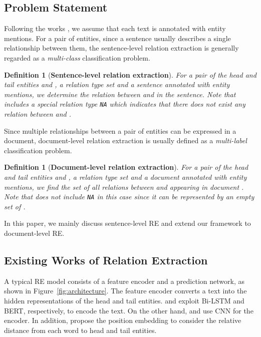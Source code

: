 \documentclass[11pt]{article}
\newtheorem{definition}[theorem]{Definition}
\newcommand{\head}{\xspace}
\newcommand{\tail}{\xspace}
\newcommand{\norel}{\texttt{NA}\xspace}
\renewcommand{\figurename}{Figure}
\begin{document}
\subsection{Problem Statement}
Following the works \cite{yao2019docred,wang2019fine}, we assume that each text is annotated with entity mentions.
For a pair of entities, since a sentence usually describes a single relationship between them, the sentence-level relation extraction is generally regarded as a \emph{multi-class} classification problem.
\begin{definition}[\textbf{Sentence-level relation extraction}] For a pair of the head and tail entities \head and \tail, a relation type set  and a sentence  annotated with entity mentions, we determine the relation  between \head and \tail in the sentence.
Note that  includes a special relation type \norel which indicates that there does not exist any relation between \head and \tail.
\end{definition}


Since multiple relationships between a pair of entities can be expressed in a document,
document-level relation extraction is usually defined as a \emph{multi-label} classification problem.
\vspace{-0.02in}
\begin{definition}[\textbf{Document-level relation extraction}] For a pair of the head and tail entities \head and \tail, a relation type set  and a document  annotated with entity mentions, we find the set of all relations  between \head and \tail appearing in document . Note that  does not include \norel in this case since it can be represented by an empty set of .
\end{definition}

In this paper, we mainly discuss sentence-level RE and extend our framework to document-level RE.









\subsection{Existing Works of Relation Extraction}
\label{sec:existingworks}
A typical RE model consists of a feature encoder and a prediction network, as shown in \figurename~\ref{fig:architecture}.
The feature encoder converts a text into the hidden representations of the head and tail entities. 
 and  exploit Bi-LSTM and BERT, respectively, to encode the text.
On the other hand,  and  use CNN for the encoder. 
In addition,  propose the position embedding to consider the relative distance from each word to head and tail entities.  
\end{document}
